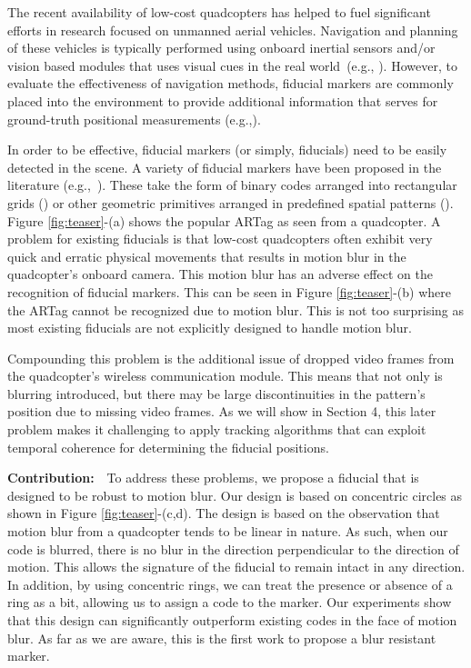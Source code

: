 \documentclass[runningheads]{llncs}
\begin{document}
The recent availability of low-cost quadcopters has helped to fuel significant
efforts in research focused on unmanned aerial vehicles.  Navigation and planning of
these vehicles is typically performed using onboard inertial sensors and/or
vision based modules that uses visual cues in the real world~(e.g., 
\cite{Davison:2007,Engel12,Engel13}). However, to evaluate the effectiveness of
navigation methods, fiducial markers are commonly placed into the environment
to provide additional information that serves for ground-truth
positional measurements (e.g.,\cite{Bosnak:2012,Lim09,Klopschitz:2007}).

In order to be effective, fiducial markers (or simply, fiducials) need
to be easily detected in the scene.  A variety of fiducial markers
have been proposed in the literature
(e.g.,~\cite{NaimarkF02,ARToolkit02,Fiala05,Pitag13,runetag11}).
These take the form of binary codes arranged into rectangular grids (\cite{ARToolkit02,Fiala05})
or other geometric primitives arranged in predefined spatial patterns
(\cite{NaimarkF02,Pitag13,runetag11}).
Figure \ref{fig:teaser}-(a) shows the popular ARTag\cite{Fiala05} as
seen from a quadcopter.  A problem for existing fiducials is that low-cost quadcopters
often exhibit very quick and erratic physical movements that
results in motion blur in the quadcopter's onboard camera.  This motion blur has
an adverse effect on the  recognition of fiducial  markers.  This can be seen in
Figure \ref{fig:teaser}-(b) where the ARTag cannot be recognized due to motion
blur. This is not too surprising as most  existing fiducials are not explicitly
designed to handle motion blur.

Compounding this problem is the additional issue of dropped video frames from
the quadcopter's wireless communication module.   This means that not only is blurring
introduced, but there may be large discontinuities in the pattern's position due
to missing video frames.  As we will show in Section 4, this later problem
makes it challenging to apply tracking algorithms that can exploit temporal
coherence for determining the fiducial positions.

\noindent\textbf{Contribution:}~~To address these problems, we propose a
fiducial that is designed to be robust to motion blur.  Our design is based on
concentric circles as shown in Figure \ref{fig:teaser}-(c,d).  The design is based
on the observation that motion blur from a quadcopter tends to be linear in
nature.  As such, when our code is blurred, there is no blur in the direction
perpendicular to the direction of motion.   This allows the signature of the
fiducial to remain intact in any direction.  In addition, by using concentric
rings, we can treat the presence or absence of a ring as a bit, allowing us to
assign a code to the marker.  Our experiments show that this design can
significantly outperform existing codes in the face of motion blur. As far as
we are aware, this is the first work to propose a blur resistant marker.
\end{document}
